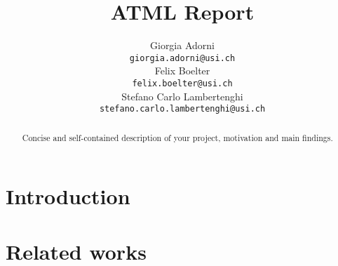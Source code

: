 \documentclass{article}
\title{ATML Report}
\author{%
	Giorgia Adorni \\
		\texttt{giorgia.adorni@usi.ch} \\
		\And
		Felix Boelter\\
		\texttt{felix.boelter@usi.ch}\\
		\And
		Stefano Carlo Lambertenghi\\
		\texttt{stefano.carlo.lambertenghi@usi.ch}\\
}
\begin{document}
	
	\maketitle
	
	\begin{abstract}
		Concise and self-contained description of your project, motivation and main findings.
	\end{abstract}
	
%	
%	
%	
	
	\section{Introduction}
	
%	
	
	
	\section{Related works}
	
%	
	
\end{document}

